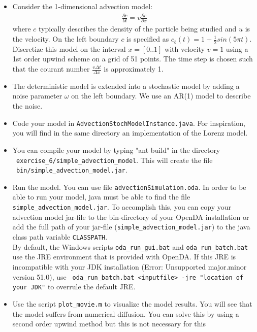 \begin{itemize}
\item Consider the 1-dimensional advection model:
   \begin{eqnarray}
      \frac{\partial c}{\partial t}=v \frac{\partial c}{\partial x}
   \end{eqnarray}
   where $c$ typically describes the density of the particle being studied and
   $u$ is the velocity. On the left boundary $c$ is specified as
   $c_b(t)=1+\frac{1}{2}sin(5 \pi t)$. Discretize this model on the interval
   $x=[0..1]$ with velocity $v=1$ using a 1st order upwind scheme on a grid of
   51 points. The time step is chosen such that the courant number $\frac{v
     \Delta t}{\Delta x}$ is approximately 1.
\item The deterministic model is extended into a stochastic model by adding a
  noise parameter $\omega$ on the left boundary. We use an AR(1) model to
  describe the noise.
\item Code your model in {\tt AdvectionStochModelInstance.java}. For
  inspiration, you will find in the same directory an implementation of the
  Lorenz model.
\item You can compile your model by typing "ant build" in the directory \\ {\tt
  exercise\_6/simple\_advection\_model}. This will create the file \\ {\tt
  bin/simple\_advection\_model.jar}.
\item Run the model. You can use file {\tt advectionSimulation.oda}. In order
  to be able to run your model, java must be able to find the file {\tt
    simple\_advection\_model.jar}. To accomplish this, you can copy your
  advection model jar-file to the bin-directory of your OpenDA installation or
  add the full path of your jar-file ({\tt simple\_advection\_model.jar}) to
  the java class path variable {\tt CLASSPATH}.\\ By default, the Windows
  scripts {\tt oda\_run\_gui.bat} and {\tt oda\_run\_batch.bat} use the JRE
  environment that is provided with OpenDA. If this JRE is incompatible with
  your JDK installation (Error: Unsupported major.minor version 51.0), use {\tt
    oda\_run\_batch.bat <inputfile> -jre "location of your JDK"} to overrule
  the default JRE.
\item Use the script {\tt plot\_movie.m} to visualize the model results. You
  will see that the model suffers from numerical diffusion. You can solve this
  by using a second order upwind method but this is not necessary for this

\end{itemize}

